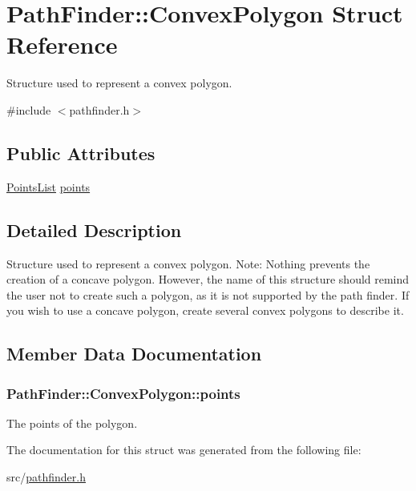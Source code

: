 \hypertarget{structPathFinder_1_1ConvexPolygon}{
\section{PathFinder::ConvexPolygon Struct Reference}
\label{structPathFinder_1_1ConvexPolygon}
}


Structure used to represent a convex polygon.  




{\ttfamily \#include $<$pathfinder.h$>$}

\subsection*{Public Attributes}
\begin{DoxyCompactItemize}
\item 
\hyperlink{classPathFinder_a792a34ce673309f873090141c3d96f1c}{PointsList} \hyperlink{structPathFinder_1_1ConvexPolygon_ac1566e0b2f32bcf575ddc81fc45d9ae0}{points}
\end{DoxyCompactItemize}


\subsection{Detailed Description}
Structure used to represent a convex polygon. Note: Nothing prevents the creation of a concave polygon. However, the name of this structure should remind the user not to create such a polygon, as it is not supported by the path finder. If you wish to use a concave polygon, create several convex polygons to describe it. 

\subsection{Member Data Documentation}
\hypertarget{structPathFinder_1_1ConvexPolygon_ac1566e0b2f32bcf575ddc81fc45d9ae0}{
\subsubsection[{points}]{ {\bf PathFinder::ConvexPolygon::points}}}
\label{structPathFinder_1_1ConvexPolygon_ac1566e0b2f32bcf575ddc81fc45d9ae0}
The points of the polygon. 

The documentation for this struct was generated from the following file:\begin{DoxyCompactItemize}
\item 
src/\hyperlink{pathfinder_8h}{pathfinder.h}\end{DoxyCompactItemize}
